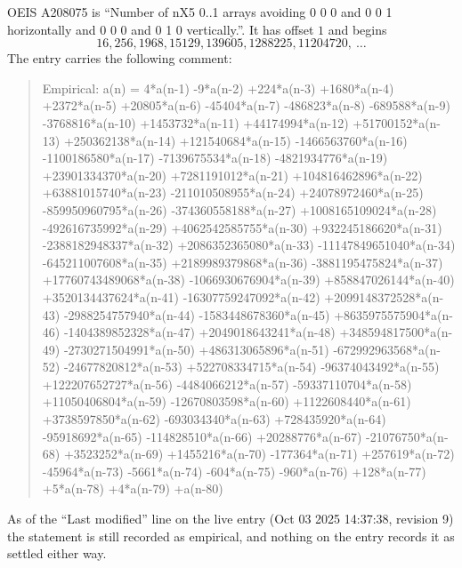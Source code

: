 \documentclass[11pt,a4paper]{article}
\theoremstyle{plain}
\theoremstyle{definition}
\begin{document}
OEIS A208075 is ``Number of nX5 0..1 arrays avoiding 0 0 0 and 0 0 1 horizontally and 0 0 0 and 0 1 0 vertically.''. It has offset
$1$ and begins
\[
16, 256, 1968, 15129, 139605, 1288225, 11204720,\ \dots
\]
The entry carries the following comment:
\begin{quote}\small
Empirical: a(n) = 4*a(n-1) -9*a(n-2) +224*a(n-3) +1680*a(n-4) +2372*a(n-5) +20805*a(n-6) -45404*a(n-7) -486823*a(n-8) -689588*a(n-9) -3768816*a(n-10) +1453732*a(n-11) +44174994*a(n-12) +51700152*a(n-13) +250362138*a(n-14) +121540684*a(n-15) -1466563760*a(n-16) -1100186580*a(n-17) -7139675534*a(n-18) -4821934776*a(n-19) +23901334370*a(n-20) +7281191012*a(n-21) +104816462896*a(n-22) +63881015740*a(n-23) -211010508955*a(n-24) +24078972460*a(n-25) -859950960795*a(n-26) -374360558188*a(n-27) +1008165109024*a(n-28) -492616735992*a(n-29) +4062542585755*a(n-30) +932245186620*a(n-31) -2388182948337*a(n-32) +2086352365080*a(n-33) -11147849651040*a(n-34) -645211007608*a(n-35) +2189989379868*a(n-36) -3881195475824*a(n-37) +17760743489068*a(n-38) -1066930676904*a(n-39) +858847026144*a(n-40) +3520134437624*a(n-41) -16307759247092*a(n-42) +2099148372528*a(n-43) -2988254757940*a(n-44) -1583448678360*a(n-45) +8635975575904*a(n-46) -1404389852328*a(n-47) +2049018643241*a(n-48) +348594817500*a(n-49) -2730271504991*a(n-50) +486313065896*a(n-51) -672992963568*a(n-52) -24677820812*a(n-53) +522708334715*a(n-54) -96374043492*a(n-55) +122207652727*a(n-56) -4484066212*a(n-57) -59337110704*a(n-58) +11050406804*a(n-59) -12670803598*a(n-60) +1122608440*a(n-61) +3738597850*a(n-62) -693034340*a(n-63) +728435920*a(n-64) -95918692*a(n-65) -114828510*a(n-66) +20288776*a(n-67) -21076750*a(n-68) +3523252*a(n-69) +1455216*a(n-70) -177364*a(n-71) +257619*a(n-72) -45964*a(n-73) -5661*a(n-74) -604*a(n-75) -960*a(n-76) +128*a(n-77) +5*a(n-78) +4*a(n-79) +a(n-80)
\end{quote}
As of the ``Last modified'' line on the live entry (Oct 03 2025 14:37:38, revision
9) the statement is still recorded as empirical, and nothing on the entry
records it as settled either way.
\end{document}
